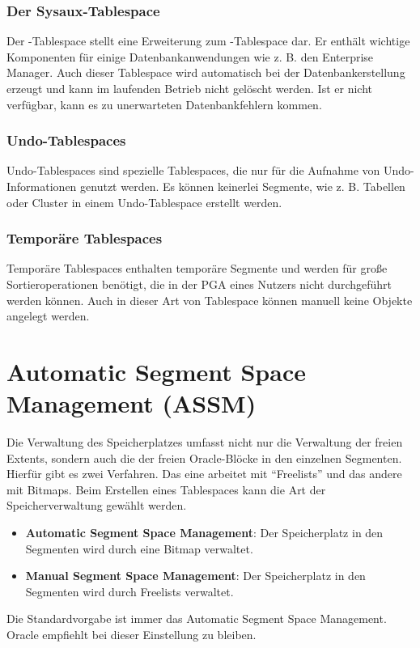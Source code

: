          \subsubsection{Der Sysaux-Tablespace}
            Der -Tablespace stellt eine Erweiterung zum -Tablespace dar. Er enthält wichtige Komponenten für einige Datenbankanwendungen wie z. B. den Enterprise Manager. Auch dieser Tablespace wird automatisch bei der Datenbankerstellung erzeugt und kann im laufenden Betrieb nicht gelöscht werden. Ist er nicht verfügbar, kann es zu unerwarteten Datenbankfehlern kommen.
          \subsubsection{Undo-Tablespaces}
            Undo-Tablespaces sind spezielle Tablespaces, die nur für die Aufnahme von Undo-In\-for\-ma\-tionen genutzt werden. Es können keinerlei Segmente, wie z. B. Tabellen oder Cluster in einem Undo-Tablespace erstellt werden.
          \subsubsection{Temporäre Tablespaces}
            Temporäre Tablespaces enthalten temporäre Segmente und werden für große Sortieroperationen benötigt, die in der PGA eines Nutzers nicht durchgeführt werden können. Auch in dieser Art von Tablespace können manuell keine Objekte angelegt werden.
    \section{Automatic Segment Space Management (ASSM)}
      Die Verwaltung des Speicherplatzes umfasst nicht nur die Verwaltung der freien Extents, sondern auch die der freien Oracle-Blöcke in den einzelnen Segmenten. Hierfür gibt es zwei Verfahren. Das eine arbeitet mit \enquote{Freelists} und das andere mit Bitmaps. Beim Erstellen eines Tablespaces kann die Art der Speicherverwaltung gewählt werden.

      \begin{itemize}
        \item \textbf{Automatic Segment Space Management}: Der Speicherplatz in den Segmenten wird durch eine Bitmap verwaltet.
        \item \textbf{Manual Segment Space Management}: Der Speicherplatz in den Segmenten wird durch Freelists verwaltet.
      \end{itemize}
      \begin{merke}
        Die Standardvorgabe ist immer das Automatic Segment Space Management. Oracle empfiehlt bei dieser Einstellung zu bleiben.
      \end{merke}
